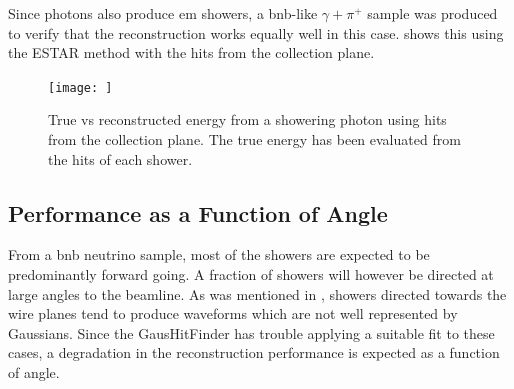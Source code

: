 Since photons also produce \gls{em} showers, a \gls{bnb}-like $\gamma + \pi^+$ sample was produced to verify that the reconstruction works equally well in this case. \FigureRef{} shows this using the ESTAR method with the hits from the collection plane. 

\begin{figure}
    \centering
    \texttt{[image: ]}
    \caption[True vs reconstructed energy from a showering photon. The true energy has been evaluated from the hits of each shower.]{True vs reconstructed energy from a showering photon using hits from the collection plane. The true energy has been evaluated from the hits of each shower.}
    \label{fig:true_vs_reco_for_induction_planes}
\end{figure}

\clearpage
\subsection{Performance as a Function of Angle}

From a \gls{bnb} neutrino sample, most of the showers are expected to be predominantly forward going. A fraction of showers will however be directed at large angles to the beamline. As was mentioned in , showers directed towards the wire planes tend to produce waveforms which are not well represented by Gaussians. Since the GausHitFinder has trouble applying a suitable fit to these cases, a degradation in the reconstruction performance is expected as a function of angle.

